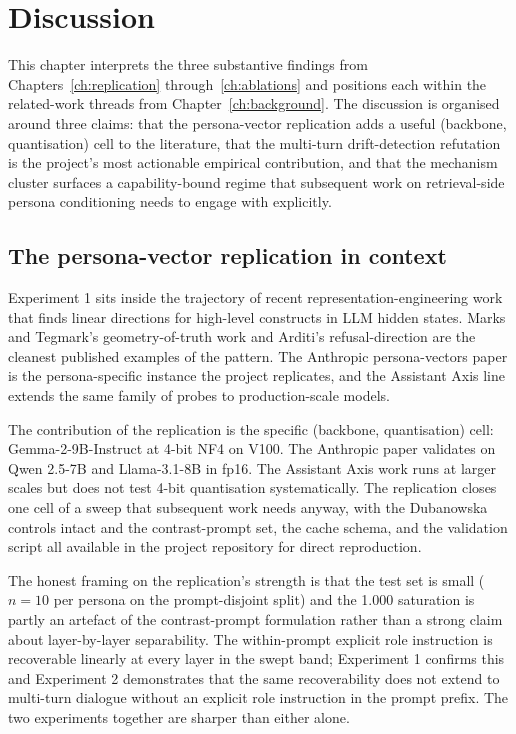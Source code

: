 \chapter{Discussion}
\label{ch:discussion}

This chapter interprets the three substantive findings from Chapters~\ref{ch:replication} through~\ref{ch:ablations} and positions each within the related-work threads from Chapter~\ref{ch:background}. The discussion is organised around three claims: that the persona-vector replication adds a useful (backbone, quantisation) cell to the literature, that the multi-turn drift-detection refutation is the project's most actionable empirical contribution, and that the mechanism cluster surfaces a capability-bound regime that subsequent work on retrieval-side persona conditioning needs to engage with explicitly.

\section{The persona-vector replication in context}

Experiment 1 sits inside the trajectory of recent representation-engineering work that finds linear directions for high-level constructs in LLM hidden states. Marks and Tegmark's geometry-of-truth work\autocite{marks2023geometry} and Arditi's refusal-direction\autocite{arditi2024refusal} are the cleanest published examples of the pattern. The Anthropic persona-vectors paper is the persona-specific instance the project replicates\autocite{chen2025personavectors}, and the Assistant Axis line extends the same family of probes to production-scale models\autocite{lu2026assistantaxis}.

The contribution of the replication is the specific (backbone, quantisation) cell: Gemma-2-9B-Instruct at 4-bit NF4 on V100. The Anthropic paper validates on Qwen 2.5-7B and Llama-3.1-8B in fp16. The Assistant Axis work runs at larger scales but does not test 4-bit quantisation systematically. The replication closes one cell of a sweep that subsequent work needs anyway, with the Dubanowska controls intact and the contrast-prompt set, the cache schema, and the validation script all available in the project repository for direct reproduction\autocite{dubanowska2025}.

The honest framing on the replication's strength is that the test set is small ($n = 10$ per persona on the prompt-disjoint split) and the \auroc{} 1.000 saturation is partly an artefact of the contrast-prompt formulation rather than a strong claim about layer-by-layer separability. The within-prompt explicit role instruction is recoverable linearly at every layer in the swept band; Experiment 1 confirms this and Experiment 2 demonstrates that the same recoverability does not extend to multi-turn dialogue without an explicit role instruction in the prompt prefix. The two experiments together are sharper than either alone.

